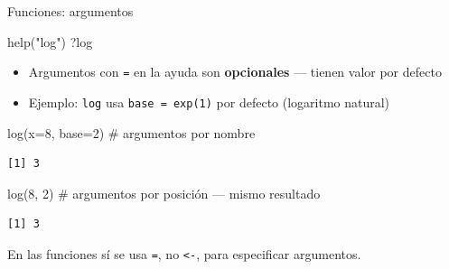 \documentclass[
  9pt,
  ignorenonframetext,
]{beamer}
\newenvironment{Shaded}{\begin{snugshade}}{\end{snugshade}}
\newcommand{\AttributeTok}[1]{\textcolor[rgb]{0.40,0.45,0.13}{#1}}
\newcommand{\CommentTok}[1]{\textcolor[rgb]{0.37,0.37,0.37}{#1}}
\newcommand{\DecValTok}[1]{\textcolor[rgb]{0.68,0.00,0.00}{#1}}
\newcommand{\FunctionTok}[1]{\textcolor[rgb]{0.28,0.35,0.67}{#1}}
\newcommand{\NormalTok}[1]{\textcolor[rgb]{0.00,0.23,0.31}{#1}}
\newcommand{\StringTok}[1]{\textcolor[rgb]{0.13,0.47,0.30}{#1}}
\providecommand{\tightlist}{%
  \setlength{\itemsep}{0pt}\setlength{\parskip}{0pt}}\usepackage{longtable,booktabs,array}
\begin{document}
\begin{frame}[fragile]{Funciones: argumentos}
\label{funciones-argumentos}
\begin{Shaded}
\begin{Highlighting}[]
\FunctionTok{help}\NormalTok{(}\StringTok{"log"}\NormalTok{)}
\NormalTok{?log}
\end{Highlighting}
\end{Shaded}

\begin{itemize}
\tightlist
\item
  Argumentos con \texttt{=} en la ayuda son \textbf{opcionales} ---
  tienen valor por defecto
\item
  Ejemplo: \texttt{log} usa \texttt{base\ =\ exp(1)} por defecto
  (logaritmo natural)
\end{itemize}

\begin{Shaded}
\begin{Highlighting}[]
\FunctionTok{log}\NormalTok{(}\AttributeTok{x=}\DecValTok{8}\NormalTok{, }\AttributeTok{base=}\DecValTok{2}\NormalTok{)   }\CommentTok{\# argumentos por nombre}
\end{Highlighting}
\end{Shaded}

\begin{verbatim}
[1] 3
\end{verbatim}

\begin{Shaded}
\begin{Highlighting}[]
\FunctionTok{log}\NormalTok{(}\DecValTok{8}\NormalTok{, }\DecValTok{2}\NormalTok{)          }\CommentTok{\# argumentos por posición — mismo resultado}
\end{Highlighting}
\end{Shaded}

\begin{verbatim}
[1] 3
\end{verbatim}

En las funciones sí se usa \texttt{=}, no \texttt{\textless{}-}, para
especificar argumentos.
\end{frame}
\end{document}

